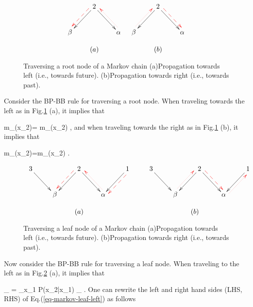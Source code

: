 \begin{figure}[h!]
$$
\begin{array}{cc}
\xymatrix{
&2\ar[dr]\ar[dl]\ar@[red]@{-->}@<-1ex>[dl]
\\
\beta
&&\alp\ar@[red]@{.>}@<-1ex>[ul]
}
&
\xymatrix{
&2\ar[dr]\ar[dl]\ar@[red]@{-->}@<1ex>[dr]
\\
\beta\ar@[red]@{.>}@<1ex>[ur]
&&\alp
}
\\
\\
(a)&(b)
\end{array}
$$
\caption{Traversing a root node of a Markov chain
(a)Propagation towards left (i.e., towards future).
(b)Propagation towards right (i.e., towards past).}
\label{fig-mp-markov-trans-root}
\end{figure}

Consider
the BP-BB rule for traversing a root node. 
When traveling
towards the left
as in Fig.\ref{fig-mp-markov-trans-root} (a), 
it implies that

\beq
m_{\alp {}}(x_2)= m_{\beta {}}(x_2)
\;,
\eeq
and
when traveling
towards the right
as in Fig.\ref{fig-mp-markov-trans-root} (b), 
it implies that

\beq
m_{\beta{}}(x_2)=m_{\alp{}}(x_2)
\;.
\eeq



\begin{figure}[h!]
$$
\begin{array}{cc}
\xymatrix{
3\ar[dr]
&&
2\ar[rd]\ar[dl]\ar@[red]@{-->}@<-1ex>[dl]
&&
1\ar[ld]\ar@[red]@{-->}@<1ex>[dl]
\\
&\beta
&&\alp\ar@[red]@{.>}@<-1ex>[ul]
}
&
\;\;\;\;\;
\xymatrix{
3\ar[dr]
&&
2\ar[rd]\ar[dl]\ar@[red]@{-->}@<1ex>[dr]
&&
1\ar[ld]
\\
&\beta\ar@[red]@{.>}@<1ex>[ur]
&&\alp\ar@[red]@{.>}@<-1ex>[ur]
}
\\
\\
(a)&(b)
\end{array}
$$
\caption{Traversing a leaf node of a Markov chain
(a)Propagation towards left (i.e., towards future).
(b)Propagation towards right (i.e., towards past).}
\label{fig-mp-markov-trans-leaf}
\end{figure}

Now consider the BP-BB rule for traversing a leaf node.
When
traveling to the left as
in Fig.\ref{fig-mp-markov-trans-leaf} (a),
it implies that

\beq
{}_{\lam}
=
\sum_{x_1}
P(x_2|x_1) 
_
{\pi}
\;.
\label{eq-markov-leaf-left}
\eeq
One can rewrite the
left and right
hand sides (LHS, RHS)
of Eq.(\ref{eq-markov-leaf-left})
as follows
 


